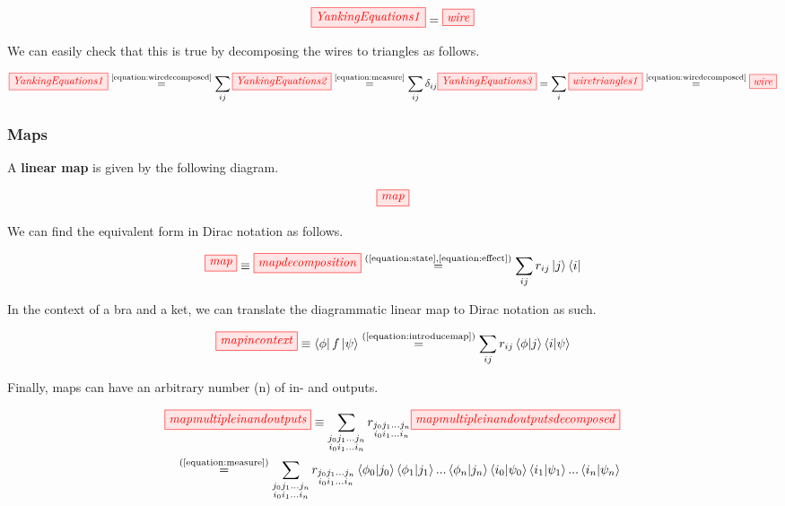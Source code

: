 \documentclass[]{article}
\newcommand{\equaltext}[1]{\ensuremath{\stackrel{\text{#1}}{=}}}
\begin{document}
\begin{equation}
\label{equation:yankingequation}
\tikzfig{YankingEquations1} = \tikzfig{wire}
\end{equation}

We can easily check that this is true by decomposing the wires to triangles as follows.

\begin{equation}
\tikzfig{YankingEquations1} \equaltext{\ref{equation:wiredecomposed}} \sum\limits_{ij} \tikzfig{YankingEquations2} \equaltext{\ref{equation:measure}} \sum\limits_{ij} \delta_{ij} \tikzfig{YankingEquations3} = \sum\limits_{i} \tikzfig{wiretriangles1} \equaltext{\ref{equation:wiredecomposed}} \tikzfig{wire}
\end{equation}

\subsubsection{Maps}
\label{maps}

A \textbf{linear map} is given by the following diagram.

\begin{equation}
\tikzfig{map}
\end{equation}

We can find the equivalent form in Dirac notation as follows.

\begin{equation}
\label{equation:introducemap}
\tikzfig{map} \equiv \tikzfig{mapdecomposition} \equaltext{(\ref{equation:state},\ref{equation:effect})} \sum_{ij}r_{ij}\ket{j}\bra{i}
\end{equation}

In the context of a bra and a ket, we can translate the diagrammatic linear map to Dirac notation as such.

\begin{equation}
\tikzfig{mapincontext} \equiv \bra{\phi}f\ket{\psi} \equaltext{(\ref{equation:introducemap})} \sum_{ij}r_{ij} \bra{\phi}\ket{j}\bra{i}\ket{\psi}
\end{equation}

Finally, maps can have an arbitrary number (n) of in- and outputs.

\begin{equation} 
\begin{aligned}
	\tikzfig{mapmultipleinandoutputs} \equiv \sum\limits_{\substack{j_0 j_1 ... j_n \\ i_0 i_1 ... i_n}} r_{\substack{j_0 j_1 ... j_n \\ i_0 i_1 ... i_n}} \tikzfig{mapmultipleinandoutputsdecomposed} \\ \equaltext{(\ref{equation:measure})} \sum\limits_{\substack{j_0 j_1 ... j_n \\ i_0 i_1 ... i_n}} r_{\substack{j_0 j_1 ... j_n \\ i_0 i_1 ... i_n}} \bra{\phi_0}\ket{j_0} \bra{\phi_1}\ket{j_1} ... \bra{\phi_n}\ket{j_n} \bra{i_0}\ket{\psi_0}\bra{i_1}\ket{\psi_1}...\bra{i_n}\ket{\psi_n}
\end{aligned}
\end{equation}
\end{document}
